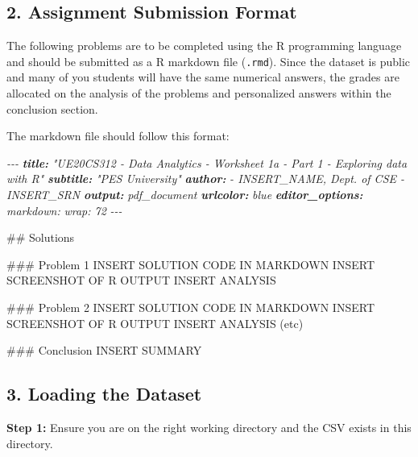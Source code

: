 \documentclass[
]{article}
\newenvironment{Shaded}{\begin{snugshade}}{\end{snugshade}}
\newcommand{\AnnotationTok}[1]{\textcolor[rgb]{0.56,0.35,0.01}{\textbf{\textit{#1}}}}
\newcommand{\CommentTok}[1]{\textcolor[rgb]{0.56,0.35,0.01}{\textit{#1}}}
\newcommand{\FunctionTok}[1]{\textcolor[rgb]{0.00,0.00,0.00}{#1}}
\newcommand{\NormalTok}[1]{#1}
\begin{document}
\hypertarget{assignment-submission-format}{%
\subsection{2. Assignment Submission
Format}\label{assignment-submission-format}}

The following problems are to be completed using the R programming
language and should be submitted as a R markdown file (\texttt{.rmd}).
Since the dataset is public and many of you students will have the same
numerical answers, the grades are allocated on the analysis of the
problems and personalized answers within the conclusion section.

\pagebreak

The markdown file should follow this format:

\begin{Shaded}
\begin{Highlighting}[]
\CommentTok{{-}{-}{-}}
\AnnotationTok{title:}\CommentTok{ "UE20CS312 {-} Data Analytics {-} Worksheet 1a {-} Part 1 {-} Exploring data with R"}
\AnnotationTok{subtitle:}\CommentTok{ "PES University"}
\AnnotationTok{author:}\CommentTok{ }
\CommentTok{  {-} \textquotesingle{}INSERT\_NAME, Dept. of CSE {-} INSERT\_SRN\textquotesingle{}}
\AnnotationTok{output:}\CommentTok{ pdf\_document}
\AnnotationTok{urlcolor:}\CommentTok{ blue}
\AnnotationTok{editor\_options:}\CommentTok{ }
\CommentTok{  markdown: }
\CommentTok{    wrap: 72}
\CommentTok{{-}{-}{-}}

\FunctionTok{\#\# Solutions}

\FunctionTok{\#\#\# Problem 1}
\NormalTok{INSERT SOLUTION CODE IN MARKDOWN}
\NormalTok{INSERT SCREENSHOT OF R OUTPUT}
\NormalTok{INSERT ANALYSIS}

\FunctionTok{\#\#\# Problem 2}
\NormalTok{INSERT SOLUTION CODE IN MARKDOWN}
\NormalTok{INSERT SCREENSHOT OF R OUTPUT}
\NormalTok{INSERT ANALYSIS}
\NormalTok{(etc)}

\FunctionTok{\#\#\# Conclusion}
\NormalTok{INSERT SUMMARY}
\end{Highlighting}
\end{Shaded}

\hypertarget{loading-the-dataset}{%
\subsection{3. Loading the Dataset}\label{loading-the-dataset}}

\textbf{Step 1:} Ensure you are on the right working directory and the
CSV exists in this directory.
\end{document}
